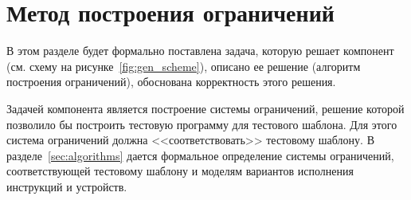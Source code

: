 %
%


\section{Метод построения ограничений}\label{sec:constraints_generation_section}

В этом разделе будет формально поставлена задача, которую решает компонент  (см. схему на рисунке~\ref{fig:gen_scheme}), описано ее решение (алгоритм построения ограничений), обоснована корректность этого решения.

Задачей компонента  является построение системы ограничений, решение которой позволило бы построить тестовую программу для тестового шаблона. Для этого система ограничений должна <<соответствовать>> тестовому шаблону. В разделе~\ref{sec:algorithms} дается формальное определение системы ограничений, соответствующей тестовому шаблону и моделям вариантов исполнения инструкций и устройств.

